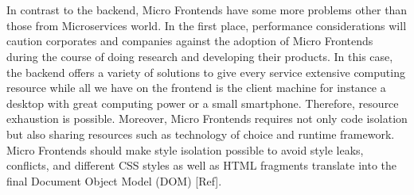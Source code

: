 \documentclass[a4paper]{book}
\begin{document}
\\ \\
In contrast to the backend, Micro Frontends have some more problems other than those from Microservices world. In the first place, performance considerations will caution corporates and companies against the adoption of Micro Frontends during the course of doing research and developing their products. In this case, the backend offers a variety of solutions to give every service extensive computing resource while all we have on the frontend is the client machine for instance a desktop with great computing power or a small smartphone. Therefore, resource exhaustion is possible. Moreover, Micro Frontends requires not only code isolation but also sharing resources such as technology of choice and runtime framework. Micro Frontends should make style isolation possible to avoid style leaks, conflicts, and different CSS styles as well as HTML fragments translate into the final Document Object Model (DOM) [Ref].
\end{document}
